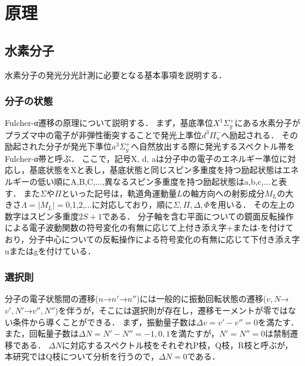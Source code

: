 \chapter{原理}

\section{水素分子}
水素分子の発光分光計測に必要となる基本事項を説明する．
\subsection{分子の状態}
Fulcher-α遷移の原理について説明する．
まず，基底準位$X^1 \Sigma^+_g$にある水素分子がプラズマ中の電子が非弾性衝突することで発光上準位$d^3 \Pi^-_u$へ励起される．
その励起された分子が発光下準位$a^3 \Sigma^+_g$へ自然放出する際に発光するスペクトル帯をFulcher-α帯と呼ぶ．
ここで，記号X, d, aは分子中の電子のエネルギー準位に対応し，基底状態をXと表し，基底状態と同じスピン多重度を持つ励起状態はエネルギーの低い順にA,B,C,...,異なるスピン多重度を持つ励起状態はa,b,c,...と表す．
また$\Sigma$や$\Pi$といった記号は，軌道角運動量$L$の軸方向への射影成分$M_L$の大きさ$\Lambda = |M_L|=$0,1,2,...に対応しており，順に$\Sigma,\Pi,\Delta,\Phi$を用いる\cite{bunsibunko-no-kiso}．
その左上の数字はスピン多重度$2S+1$である\cite{bunsibunko-no-kiso}．
分子軸を含む平面についての鏡面反転操作による電子波動関数の符号変化の有無に応じて上付き添え字+または-を付けており，分子中心についての反転操作による符号変化の有無に応じて下付き添え字uまたはgを付けている\cite{bunsibunko-no-kiso}．

\subsection{選択則}
分子の電子状態間の遷移($n$→$n'$→$n''$)には一般的に振動回転状態の遷移($v,N$→$v',N'$→$v'',N''$)を伴うが，そこには選択則が存在し，遷移モーメントが零ではない条件から導くことができる\cite{bunsibunko-no-kiso}．
まず，振動量子数は$\Delta v = v'-v'' = 0$を満たす．
また，回転量子数は$\Delta N = N' - N'' = -1,0,1$を満たすが，$N'=N''=0$は禁制遷移である．
$\Delta N$に対応するスペクトル枝をそれぞれP枝，Q枝，R枝と呼ぶが，本研究ではQ枝について分析を行うので，$\Delta N = 0$である．


